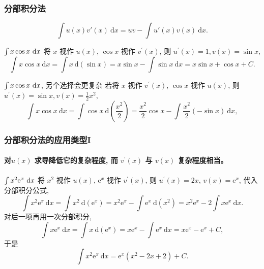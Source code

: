\documentclass[
10pt,
aspectratio=43,
]{beamer}
\begin{document}
\begin{frame}
	\frametitle{分部积分法}
	\everymath{\displaystyle}
	\begin{block}{}
		$$
			\int u(x)v'(x)\mathrm{~d} x = uv - \int u'(x)v(x)\mathrm{~d} x.
		$$
	\end{block}
	\begin{exampleblock}{$\color{black}\int x \cos x \mathrm{~d} x$}
		将 $x$ 视作 $u(x)$, $\cos x$ 视作 $v^{\prime}(x)$, 则 $u^{\prime}(x)=1, v(x)=\sin x$,
		$$
			\int x \cos x \mathrm{~d} x  =\int x \mathrm{~d}(\sin x)  =x \sin x-\int \sin x \mathrm{~d} x=x \sin x+\cos x+C.
		$$
	\end{exampleblock}
	\begin{alertblock}{$\color{black}\int x \cos x \mathrm{~d} x$, {\color{black}另个选择会更复杂}}
		若将 $x$ 视作 $v^{\prime}(x)$, $\cos x$ 视作 $u(x)$, 则 $u^{\prime}(x)=\sin x, v(x)=\frac{1}{2}x^2$,
		$$
			\int x \cos x \mathrm{~d} x=\int \cos x \mathrm{~d}\left(\frac{x^2}{2}\right)=\frac{x^2}{2} \cos x-\int \frac{x^2}{2}(-\sin x) \mathrm{~d} x,
		$$
	\end{alertblock}
\end{frame}

\begin{frame}
	\frametitle{分部积分法的应用类型I}
	\framesubtitle{对$u(x)$ 求导降低它的复杂程度, 而 $v^{\prime}(x)$ 与 $v(x)$ 复杂程度相当。}
	\everymath{\displaystyle}
	\begin{exampleblock}{$\color{black}\int x^2 \mathrm{e}^x \mathrm{~d} x$}
		将 $x^2$ 视作 $u(x)$, $\mathrm{e}^x$ 视作 $v^{\prime}(x)$, 则 $u^{\prime}(x)=2 x$, $v(x)=\mathrm{e}^x$, 代入分部积分公式,
		$$
			\int x^2 \mathrm{e}^x \mathrm{~d} x=\int x^2 \mathrm{~d}\left(\mathrm{e}^x\right)=x^2 \mathrm{e}^x-\int \mathrm{e}^x \mathrm{~d}\left(x^2\right)=x^2 \mathrm{e}^x-2 \int x \mathrm{e}^x \mathrm{~d} x.
		$$
		对后一项再用一次分部积分,
		$$
			\int x \mathrm{e}^x \mathrm{~d} x=\int x \mathrm{~d}\left(\mathrm{e}^x\right)=x \mathrm{e}^x-\int \mathrm{e}^x \mathrm{~d} x=x \mathrm{e}^x-\mathrm{e}^x+C,
		$$
		于是
		$$
			\int x^2 \mathrm{e}^x \mathrm{~d} x=\mathrm{e}^x\left(x^2-2 x+2\right)+C.
		$$
	\end{exampleblock}
\end{frame}
\end{document}
